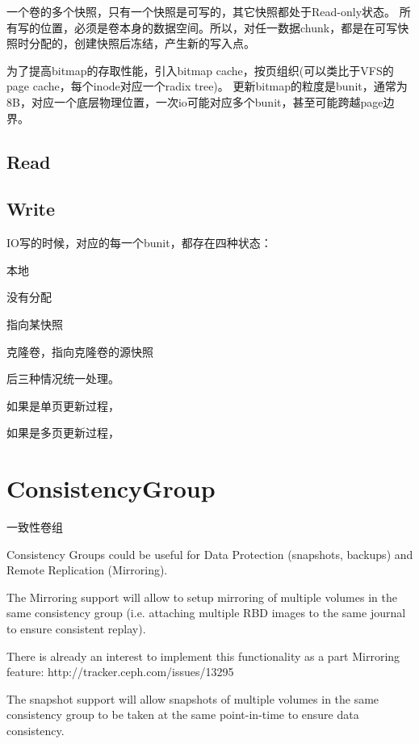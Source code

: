 一个卷的多个快照，只有一个快照是可写的，其它快照都处于Read-only状态。
所有写的位置，必须是卷本身的数据空间。所以，对任一数据chunk，都是在可写快照时分配的，创建快照后冻结，产生新的写入点。

为了提高bitmap的存取性能，引入bitmap cache，按页组织(可以类比于VFS的page cache，每个inode对应一个radix tree)。
更新bitmap的粒度是bunit，通常为8B，对应一个底层物理位置，一次io可能对应多个bunit，甚至可能跨越page边界。

\subsection{Read}

\subsection{Write}

IO写的时候，对应的每一个bunit，都存在四种状态：
\begin{enumbox}
\item 本地
\item 没有分配
\item 指向某快照
\item 克隆卷，指向克隆卷的源快照
\end{enumbox}

后三种情况统一处理。

如果是单页更新过程，

如果是多页更新过程，

\section{ConsistencyGroup}

一致性卷组 

\begin{shadequote}

Consistency Groups could be useful for Data Protection (snapshots, backups) and
Remote Replication (Mirroring).

The Mirroring support will allow to setup mirroring of multiple volumes in the
same consistency group (i.e. attaching multiple RBD images to the same journal
to ensure consistent replay).

There is already an interest to implement this functionality as a part Mirroring feature:
http://tracker.ceph.com/issues/13295

The snapshot support will allow snapshots of multiple volumes in the same
consistency group to be taken at the same point-in-time to ensure data
consistency.
\end{shadequote}

